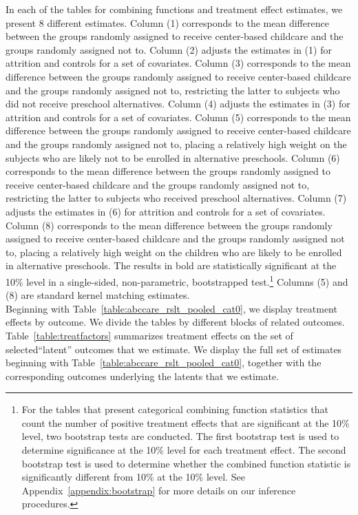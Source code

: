 \noindent In each of the tables for combining functions and treatment effect estimates, we present 8 different estimates. Column (1) corresponds to the mean difference between the groups randomly assigned to receive center-based childcare and the groups randomly assigned not to. Column (2) adjusts the estimates in (1) for attrition and controls for a set of covariates. Column (3) corresponds to the mean difference between the groups randomly assigned to receive center-based childcare and the groups randomly assigned not to, restricting the latter to subjects who did not receive preschool alternatives. Column (4) adjusts the estimates in (3) for attrition and controls for a set of covariates. Column (5) corresponds to the mean difference between the groups randomly assigned to receive center-based childcare and the groups randomly assigned not to, placing a relatively high weight on the subjects who are likely not to be enrolled in alternative preschools. Column (6) corresponds to the mean difference between the groups randomly assigned to receive center-based childcare and the groups randomly assigned not to, restricting the latter to subjects who received preschool alternatives. Column (7) adjusts the estimates in (6) for attrition and controls for a set of covariates. Column (8) corresponds to the mean difference between the groups randomly assigned to receive center-based childcare and the groups randomly assigned not to, placing a relatively high weight on the children who are likely to be enrolled in alternative preschools. The results in bold are statistically significant at the 10\% level in a single-sided, non-parametric, bootstrapped test.\footnote{For the tables that present categorical combining function statistics that count the number of positive treatment effects that are significant at the 10\% level, two bootstrap tests are conducted. The first bootstrap test is used to determine significance at the 10\% level for each treatment effect. The second bootstrap test is used to determine whether the combined function statistic is significantly different from 10\% at the  10\% level. See Appendix~\ref{appendix:bootstrap} for more details on our inference procedures.} Columns (5) and (8) are standard kernel matching estimates. \\

\noindent Beginning with Table~\ref{table:abccare_rslt_pooled_cat0}, we display treatment effects by outcome. We divide the tables by different blocks of related outcomes. Table~\ref{table:treatfactors} summarizes treatment effects on the set of selected``latent'' outcomes that we estimate. We display the full set of estimates beginning with Table~\ref{table:abccare_rslt_pooled_cat0}, together with the corresponding outcomes underlying the latents that we estimate.




